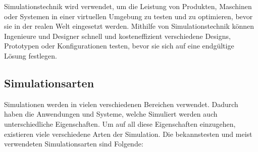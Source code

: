 Simulationstechnik wird verwendet, um die Leistung von Produkten, Maschinen oder Systemen in einer virtuellen Umgebung zu testen und zu optimieren, bevor sie in der realen Welt eingesetzt werden. Mithilfe von Simulationstechnik können Ingenieure und Designer schnell und kosteneffizient verschiedene Designs, Prototypen oder Konfigurationen testen, bevor sie sich auf eine endgültige Lösung festlegen.

\subsection{Simulationsarten}
Simulationen werden in vielen verschiedenen Bereichen verwendet. Dadurch haben die Anwendungen und Systeme, welche Simuliert werden auch unterschiedliche Eigenschaften. Um auf all diese Eigenschaften einzugehen, existieren viele verschiedene Arten der Simulation. Die bekannstesten und meist verwendeten Simulationsarten sind Folgende:

